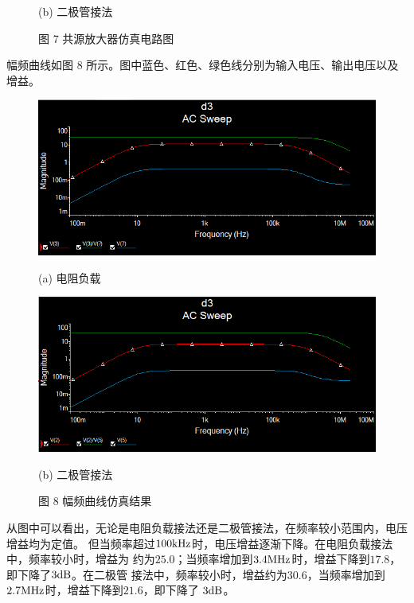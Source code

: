 \documentclass[hyperref, UTF8]{ctexart}
\newcommand{\kilohertz}{{\rm kHz}}
\newcommand{\megahertz}{{\rm MHz}}
\newcommand{\decibel}{{\rm dB}}
\begin{document}
\begin{figure}[!htb]
\begin{minipage}[t]{0.349\textwidth}
    \caption*{(b) 二极管接法}
    \end{minipage}
    \caption*{图 7 共源放大器仿真电路图}
\end{figure}

幅频曲线如图 8 所示。图中蓝色、红色、绿色线分别为输入电压、输出电压以及增益。
\begin{figure}[!htb]
    \centering
    \begin{minipage}[t]{0.453\textwidth}
    \centering
    \includegraphics[width=1\textwidth]{res2-a.png}
    \caption*{(a) 电阻负载}
    \end{minipage}
    \begin{minipage}[t]{0.454\textwidth}
    \centering
    \includegraphics[width=1\textwidth]{res2-b.png}
    \caption*{(b) 二极管接法}
    \end{minipage}
    \caption*{图 8 幅频曲线仿真结果}
\end{figure}

从图中可以看出，无论是电阻负载接法还是二极管接法，在频率较小范围内，电压增益均为定值。
但当频率超过$100\kilohertz$时，电压增益逐渐下降。在电阻负载接法中，频率较小时，增益为
约为$25.0$；当频率增加到$3.4\megahertz$时，增益下降到$17.8$，即下降了$3\decibel$。在二极管
接法中，频率较小时，增益约为$30.6$，当频率增加到$2.7\megahertz$时，增益下降到$21.6$，即下降了
$3\decibel$。
\end{document}
